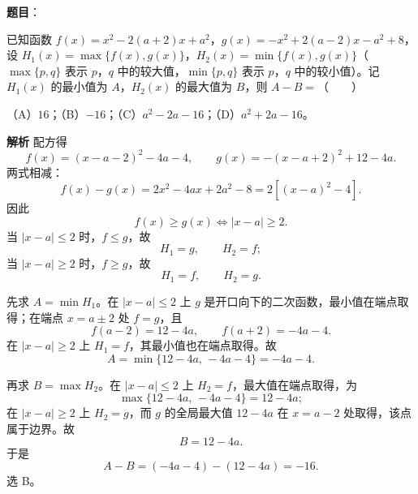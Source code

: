 \begin{answer}

\textbf{题目}：

已知函数 $f(x)=x^2-2(a+2)x+a^2$，$g(x)=-x^2+2(a-2)x-a^2+8$，设 $H_1(x)=\max\{f(x),g(x)\}$，$H_2(x)=\min\{f(x),g(x)\}$（$\max\{p,q\}$ 表示 $p$，$q$ 中的较大值，$\min\{p,q\}$ 表示 $p$，$q$ 中的较小值）。记 $H_1(x)$ 的最小值为 $A$，$H_2(x)$ 的最大值为 $B$，则 $A-B=$\mbox{（　　）}

（A）$16$；（B）$-16$；（C）$a^2-2a-16$；（D）$a^2+2a-16$。

\textbf{解析}
配方得
\nopagebreak[4]
\[f(x)=(x-a-2)^2-4a-4,\qquad g(x)=-(x-a+2)^2+12-4a.\]
两式相减：
\nopagebreak[4]
\[f(x)-g(x)=2x^2-4ax+2a^2-8=2\left[(x-a)^2-4\right].\]
因此
\nopagebreak[4]
\[f(x)\geqslant g(x)\iff |x-a|\geqslant2.\]
当 $|x-a|\leqslant2$ 时，$f\leqslant g$，故
\nopagebreak[4]
\[H_1=g,\qquad H_2=f;\]
当 $|x-a|\geqslant2$ 时，$f\geqslant g$，故
\nopagebreak[4]
\[H_1=f,\qquad H_2=g.\]

先求 $A=\min H_1$。在 $|x-a|\leqslant2$ 上 $g$ 是开口向下的二次函数，最小值在端点取得；在端点 $x=a\pm2$ 处 $f=g$，且
\nopagebreak[4]
\[f(a-2)=12-4a,\qquad f(a+2)=-4a-4.\]
在 $|x-a|\geqslant2$ 上 $H_1=f$，其最小值也在端点取得。故
\nopagebreak[4]
\[A=\min\{12-4a,\,-4a-4\}=-4a-4.\]

再求 $B=\max H_2$。在 $|x-a|\leqslant2$ 上 $H_2=f$，最大值在端点取得，为
\nopagebreak[4]
\[\max\{12-4a,\,-4a-4\}=12-4a;\]
在 $|x-a|\geqslant2$ 上 $H_2=g$，而 $g$ 的全局最大值 $12-4a$ 在 $x=a-2$ 处取得，该点属于边界。故
\nopagebreak[4]
\[B=12-4a.\]
于是
\nopagebreak[4]
\[A-B=(-4a-4)-(12-4a)=-16.\]
选 B。


\end{answer}
